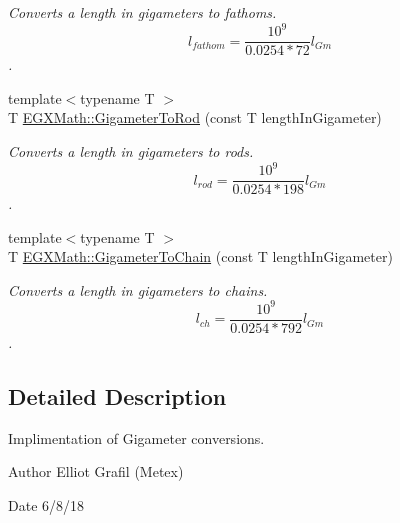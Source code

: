 \begin{DoxyCompactItemize}
\begin{DoxyCompactList}\small\item\em Converts a length in gigameters to fathoms. \[ l_{fathom}= \frac{10^{9}}{0.0254 * 72} l_{Gm} \]. \end{DoxyCompactList}\item 
{\footnotesize template$<$typename T $>$ }\\T \mbox{\hyperlink{group___e_g_x_math-_conversions-_length_conversions-_s_i-_gigameter-_surveyors_ga73a408111b846e3cb97aa1990135ec46}{E\+G\+X\+Math\+::\+Gigameter\+To\+Rod}} (const T length\+In\+Gigameter)
\begin{DoxyCompactList}\small\item\em Converts a length in gigameters to rods. \[ l_{rod}= \frac{10^{9}}{0.0254 * 198} l_{Gm} \]. \end{DoxyCompactList}\item 
{\footnotesize template$<$typename T $>$ }\\T \mbox{\hyperlink{group___e_g_x_math-_conversions-_length_conversions-_s_i-_gigameter-_surveyors_ga1ed5bf3c72c4a51beebcddf4f7e87631}{E\+G\+X\+Math\+::\+Gigameter\+To\+Chain}} (const T length\+In\+Gigameter)
\begin{DoxyCompactList}\small\item\em Converts a length in gigameters to chains. \[ l_{ch}= \frac{10^{9}}{0.0254 * 792} l_{Gm} \]. \end{DoxyCompactList}\end{DoxyCompactItemize}


\subsection{Detailed Description}
Implimentation of Gigameter conversions. 

\begin{DoxyAuthor}{Author}
Elliot Grafil (Metex) 
\end{DoxyAuthor}
\begin{DoxyDate}{Date}
6/8/18 
\end{DoxyDate}
